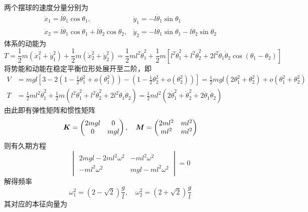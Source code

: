 \begin{example}[双摆]
两个摆球的速度分量分别为
\begin{equation*}
\begin{array}{ll}
	\dot{x}_1 = l \dot{\theta}_1\cos\theta_1,& \dot{y}_1 = -l \dot{\theta}_1\sin\theta_1 \\
	\dot{x}_2 = l \dot{\theta}_1\cos\theta_1+l \dot{\theta}_2\cos\theta_2,& \dot{y}_2 = -l \dot{\theta}_1\sin\theta_1-l \dot{\theta}_2\sin\theta_2
\end{array}
\end{equation*}
体系的动能为
\begin{equation*}
	T = \frac12 m(\dot{x}_1^2+\dot{y}_1^2) + \frac12 m(\dot{x}_2^2+\dot{y}_2^2) = \frac12 ml^2 \dot{\theta}_1^2 + \frac12 m\left[l^2 \dot{\theta}_1^2 + l^2 \dot{\theta}_2^2 + 2l^2 \dot{\theta}_1 \dot{\theta}_2 \cos (\theta_1 - \theta_2)\right]
\end{equation*}
将势能和动能在稳定平衡位形处展开至二阶，即
\begin{align*}
	V & = mgl\left[3-2\left(1-\frac12 \theta_1^2+o(\theta_1^2)\right)-\left(1-\frac12 \theta_2^2+o(\theta_2^2)\right)\right] = \frac12 mgl(2\theta_1^2 + \theta_2^2) + o(\theta_1^2+\theta_2^2) \\
	T & = \frac12 ml^2 \dot{\theta}_1^2 + \frac12 m\left(l^2 \dot{\theta}_1^2 + l^2 \dot{\theta}_2^2 + 2l^2 \dot{\theta}_1 \dot{\theta}_2\right) = \frac12 ml^2 \left(2\dot{\theta}_1^2+\dot{\theta}_2^2+ 2\dot{\theta}_1\dot{\theta}_2\right)
\end{align*}
由此即有弹性矩阵和惯性矩阵
\begin{equation*}
	\boldsymbol{K} = \begin{pmatrix} 2mgl & 0 \\ 0 & mgl \end{pmatrix},\quad \boldsymbol{M} = \begin{pmatrix} 2ml^2 & ml^2 \\ ml^2 & ml^2 \end{pmatrix}
\end{equation*}
则有久期方程
\begin{equation*}
	\begin{vmatrix}
		2mgl-2ml^2 \omega^2 & -ml^2\omega^2 \\
		-ml^2\omega^2 & mgl-ml^2\omega^2
	\end{vmatrix} = 0
\end{equation*}
解得频率
\begin{equation*}
	\omega_1^2 = (2-\sqrt{2})\frac{g}{l},\quad \omega_2^2 = (2+\sqrt{2})\frac{g}{l}
\end{equation*}
其对应的本征向量为

\end{example}
